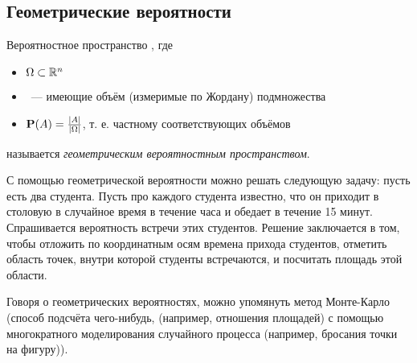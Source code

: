 \begin{example}
\end{example}

\subsection{Геометрические вероятности}

\begin{definition}
Вероятностное пространство \PSP, где
\begin{itemize}
	\item $\Omega \subset \mathbb{R}^n$
	\item \Flg~--- имеющие объём (измеримые по Жордану) подмножества \oO
	\item $\mathbf{P}(A)=\frac{|A|}{|\Omega|}$, т. е. частному соответствующих объёмов
\end{itemize}
называется {\it геометрическим вероятностным пространством}.
\end{definition}

С помощью геометрической вероятности можно решать следующую задачу: пусть есть два студента. Пусть про каждого студента известно, что он приходит в столовую в случайное время в течение часа и обедает в течение 15 минут. Спрашивается вероятность встречи этих студентов. Решение заключается в том, чтобы отложить по координатным осям времена прихода студентов, отметить область точек, внутри которой студенты встречаются, и посчитать площадь этой области.

Говоря о геометрических вероятностях, можно упомянуть метод Монте-Карло (способ подсчёта чего-нибудь, (например, отношения площадей) с помощью многократного моделирования случайного процесса (например, бросания точки на фигуру)).
